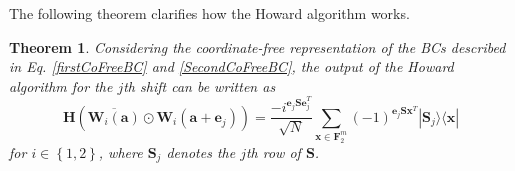 \documentclass[lettersize,journal,onecolumn]{IEEEtran}
\newtheorem{theorem}{Theorem}
\begin{document}
   \noindent The following theorem clarifies how the Howard algorithm works.
  \begin{theorem}\label{TheoHowardHowWork}
  	Considering the coordinate-free representation of the BCs described in Eq. \eqref{firstCoFreeBC} and \eqref{SecondCoFreeBC}, the output of the Howard algorithm for the $j$th shift can be written as
  	 \begin{equation}
  	 	\mathbf{H}\left(\overline{\mathbf{W}_i\left(\mathbf{a}\right)}\odot \mathbf{W}_i\left(\mathbf{a+e}_j\right)\right)  = \frac{-i^{\mathbf{e}_j \mathbf{S e}_j^T}}{\sqrt{N}} \sum_{ \mathbf{x} \in \mathbf{F}_2^m}{(-1)^{\mathbf{e}_j \mathbf{S} \mathbf{x}^T} |\mathbf{S}_j\rangle \langle \mathbf{x}| }\label{FinHcalRes}
  	 \end{equation}
   for $i\in \left\{1,2\right\}$, where $\mathbf{S}_j$ denotes the $j$th row of $\mathbf{S}$.
  \end{theorem}
\end{document}
